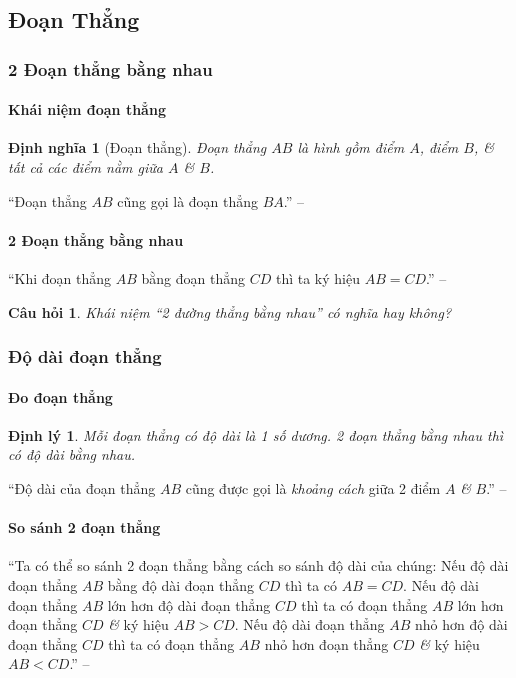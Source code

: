 \documentclass{article}
\numberwithin{equation}{section}
\newtheorem{dinhnghia}{Định nghĩa}[section]
\newtheorem{cauhoi}{Câu hỏi}[section]
\newtheorem{dinhly}{Định lý}[section]
\begin{document}
\subsection{Đoạn Thẳng}

\subsubsection{2 Đoạn thẳng bằng nhau}

\paragraph{Khái niệm đoạn thẳng}
\begin{dinhnghia}[Đoạn thẳng]
	\emph{Đoạn thẳng $AB$} là hình gồm điểm $A$, điểm $B$, \textit{\&} tất cả các điểm nằm giữa $A$ \textit{\&} $B$.
\end{dinhnghia}
``Đoạn thẳng $AB$ cũng gọi là đoạn thẳng $BA$.'' -- \cite[p. 84]{SGK_Toan_6_Canh_Dieu_tap_2}

\paragraph{2 Đoạn thẳng bằng nhau}
``Khi đoạn thẳng $AB$ bằng đoạn thẳng $CD$ thì ta ký hiệu $AB = CD$.'' -- \cite[p. 85]{SGK_Toan_6_Canh_Dieu_tap_2}

\begin{cauhoi}
	Khái niệm ``2 đường thẳng bằng nhau'' có nghĩa hay không?
\end{cauhoi}

\subsubsection{Độ dài đoạn thẳng}

\paragraph{Đo đoạn thẳng}
\begin{dinhly}
	Mỗi đoạn thẳng có độ dài là 1 số dương. 2 đoạn thẳng bằng nhau thì có độ dài bằng nhau.
\end{dinhly}
``Độ dài của đoạn thẳng $AB$ cũng được gọi là \textit{khoảng cách} giữa 2 điểm $A$ \textit{\&} $B$.'' -- \cite[p. 85]{SGK_Toan_6_Canh_Dieu_tap_2}

\paragraph{So sánh 2 đoạn thẳng}
``Ta có thể so sánh 2 đoạn thẳng bằng cách so sánh độ dài của chúng: Nếu độ dài đoạn thẳng $AB$ bằng độ dài đoạn thẳng $CD$ thì ta có $AB = CD$. Nếu độ dài đoạn thẳng $AB$ lớn hơn độ dài đoạn thẳng $CD$ thì ta có đoạn thẳng $AB$ lớn hơn đoạn thẳng $CD$ \textit{\&} ký hiệu $AB > CD$. Nếu độ dài đoạn thẳng $AB$ nhỏ hơn độ dài đoạn thẳng $CD$ thì ta có đoạn thẳng $AB$ nhỏ hơn đoạn thẳng $CD$ \textit{\&} ký hiệu $AB < CD$.'' -- \cite[p. 86]{SGK_Toan_6_Canh_Dieu_tap_2}
\end{document}
